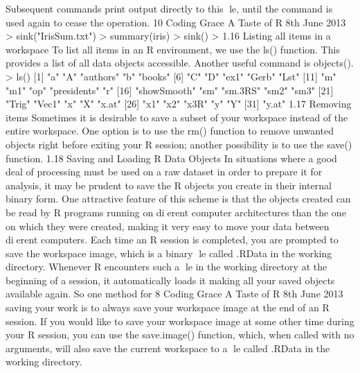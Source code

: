 Subsequent commands print output directly to this le, until the command is used again to
cease the operation.
10
Coding Grace A Taste of R 8th June 2013
> sink("IrisSum.txt")
> summary(iris)
> sink()
>
1.16 Listing all items in a workspace
To list all items in an R environment, we use the ls() function. This provides a list of all data
objects accessible. Another useful command is objects().
> ls()
[1] "a" "A" "authors" "b" "books"
[6] "C" "D" "ex1" "Gerb" "Lst"
[11] "m" "m1" "op" "presidents" "r"
[16] "showSmooth" "sm" "sm.3RS" "sm2" "sm3"
[21] "Trig" "Vec1" "x" "X" "x.at"
[26] "x1" "x2" "x3R" "y" "Y"
[31] "y.at"
1.17 Removing items
Sometimes it is desirable to save a subset of your workspace instead of the entire workspace.
One option is to use the rm() function to remove unwanted objects right before exiting your R
session; another possibility is to use the save() function.
1.18 Saving and Loading R Data Objects
In situations where a good deal of processing must be used on a raw dataset in order to prepare
it for analysis, it may be prudent to save the R objects you create in their internal binary form.
One attractive feature of this scheme is that the objects created can be read by R programs
running on dierent computer architectures than the one on which they were created, making it
very easy to move your data between dierent computers. Each time an R session is completed,
you are prompted to save the workspace image, which is a binary le called .RData in the
working directory.
Whenever R encounters such a le in the working directory at the beginning of a session,
it automatically loads it making all your saved objects available again. So one method for
8
Coding Grace A Taste of R 8th June 2013
saving your work is to always save your workspace image at the end of an R session. If you
would like to save your workspace image at some other time during your R session, you can use
the save.image() function, which, when called with no arguments, will also save the current
workspace to a le called .RData in the working directory.

